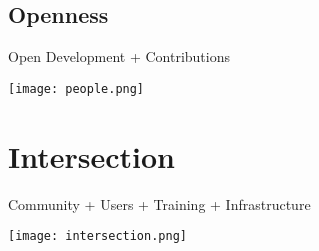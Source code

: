 \documentclass[12pt]{euslides}
\begin{document}
\subsection{Openness}
\begin{frame}{Open Development + Contributions}
	\begin{center}
		\texttt{[image: people.png]}
	\end{center}
\end{frame}

\section{Intersection}
\begin{frame}{Community + Users + Training + Infrastructure}
	\begin{center}
		\texttt{[image: intersection.png]}
	\end{center}
\end{frame}
\end{document}

